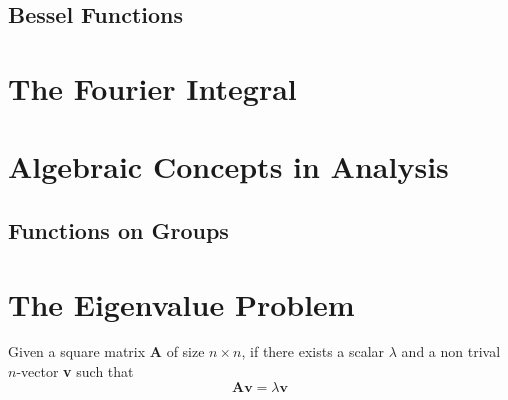 \documentclass[conference,12pt,onecolumn,compsoc]{IEEEtran}
\begin{document}
\subsection{Bessel Functions}
\label{section: Bessel Functions}




\section{The Fourier Integral}
\label{section: The Fourier Integral}

\section{Algebraic Concepts in Analysis}
\label{section: Algebraic Concepts in Analysis}

\subsection{Functions on Groups}
\label{section: Functions on Groups}

\section{The Eigenvalue Problem}
\label{section: The Eigenvalue Problem}

Given a square matrix \textbf{A} of size $n \times n$, if there exists a scalar $\lambda$ and a non trival $n$-vector \textbf{v} such that
\begin{equation}
\textbf{Av}=\lambda\textbf{v}
\label{eigenvalue equation 1}
\end{equation}
\end{document}

